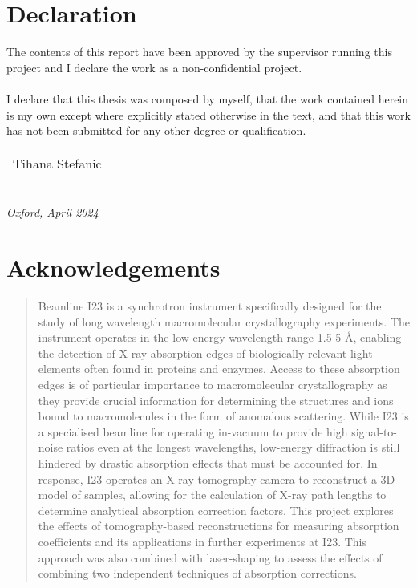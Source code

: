 %

\newpage
\setcounter{page}{1}
\section*{Declaration}
The contents of this report have been approved by the supervisor running this project and I declare the work as a non-confidential project.\\\\
I declare that this thesis was composed by myself, that the work contained herein is my own except where explicitly stated otherwise in the text, and that this work has not been submitted for any other degree or qualification. \\
\bigskip


\begin{flushright}
	\begin{tabular}{m{5cm}}
		\\ \hline
		\centering Tihana Stefanic \\
		
	\end{tabular}\\
	
	\raggedleft\textit{Oxford, April 2024}
\end{flushright}
\newpage

\section*{Acknowledgements}


\newpage

\newpage

\printacronyms[template=description]
\newpage
\begin{abstract}
	Beamline I23 is a synchrotron instrument specifically designed for the study of long wavelength macromolecular crystallography experiments. The instrument operates in the low-energy wavelength range 1.5-5 Å, enabling the detection of X-ray absorption edges of biologically relevant light elements often found in proteins and enzymes. Access to these absorption edges is of particular importance to macromolecular crystallography as they provide crucial information for determining the structures and ions bound to macromolecules in the form of anomalous scattering.
    While I23 is a specialised beamline for operating in-vacuum to provide high signal-to-noise ratios even at the longest wavelengths, low-energy diffraction is still hindered by drastic absorption effects that must be accounted for. In response, I23 operates an X-ray tomography camera to reconstruct a 3D model of samples, allowing for the calculation of X-ray path lengths to determine analytical absorption correction factors.
    This project explores the effects of tomography-based reconstructions for measuring absorption coefficients and its applications in further experiments at I23. This approach was also combined with laser-shaping to assess the effects of combining two independent techniques of absorption corrections.
\end{abstract}
\newpage
\tableofcontents                                %
\newpage


\listoffigures
\listoftables
\newpage